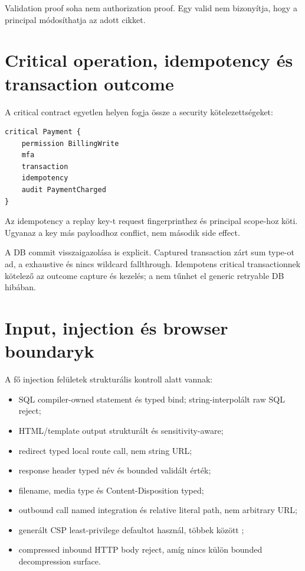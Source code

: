 Validation proof soha nem authorization proof. Egy valid  nem bizonyítja, hogy a principal módosíthatja az adott cikket.

\section{Critical operation, idempotency és transaction outcome}

A critical contract egyetlen helyen fogja össze a security kötelezettségeket:

\begin{lstlisting}[language=RWLang]
critical Payment {
    permission BillingWrite
    mfa
    transaction
    idempotency
    audit PaymentCharged
}
\end{lstlisting}

Az idempotency a replay key-t request fingerprinthez és principal scope-hoz köti. Ugyanaz a key más payloadhoz conflict, nem második side effect.

A DB commit visszaigazolása is explicit. Captured transaction zárt  sum type-ot ad, a  exhaustive és nincs wildcard fallthrough. Idempotens critical transactionnek kötelező az outcome capture és kezelés; a  nem tűnhet el generic retryable DB hibában.

\section{Input, injection és browser boundaryk}

A fő injection felületek strukturális kontroll alatt vannak:

\begin{itemize}
  \item SQL compiler-owned statement és typed bind; string-interpolált raw SQL reject;
  \item HTML/template output strukturált és sensitivity-aware;
  \item redirect typed local route call, nem string URL;
  \item response header typed név és bounded validált érték;
  \item filename, media type és Content-Disposition typed;
  \item outbound call named integration és relative literal path, nem arbitrary URL;
  \item generált CSP least-privilege defaultot használ, többek között ;
  \item compressed inbound HTTP body reject, amíg nincs külön bounded decompression surface.
\end{itemize}

